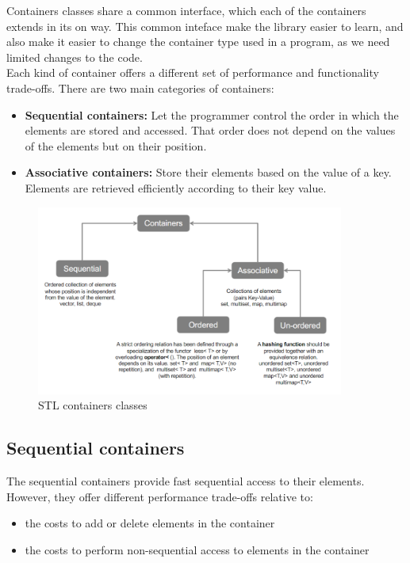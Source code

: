 Containers classes share a common interface, which each of the containers extends in its 
on way. This common inteface make the library easier to learn, and also make it easier to
change the container type used in a program, as we need limited changes to the code.\\

Each kind of container offers a different set of performance and functionality trade-offs.
There are two main categories of containers:

\begin{itemize}
    \item \textbf{Sequential containers:} Let the programmer control the order in which the
    elements are stored and accessed. That order does not depend on the values of the elements
    but on their position.

    \item \textbf{Associative containers:} Store their elements based on the value of a key.
    Elements are retrieved efficiently according to their key value.
\end{itemize}

\begin{figure}[H]
    \centering
    \includegraphics[width=0.9\textwidth]{figures/container_types.png}
    \caption{STL containers classes}
    \label{fig:containers}
\end{figure}

\subsection{Sequential containers}

The sequential containers provide fast sequential access to their elements. However, they offer 
different performance trade-offs relative to:
\begin{itemize}
    \item the costs to add or delete elements in the container
    \item the costs to perform non-sequential access to elements in the container
\end{itemize}

